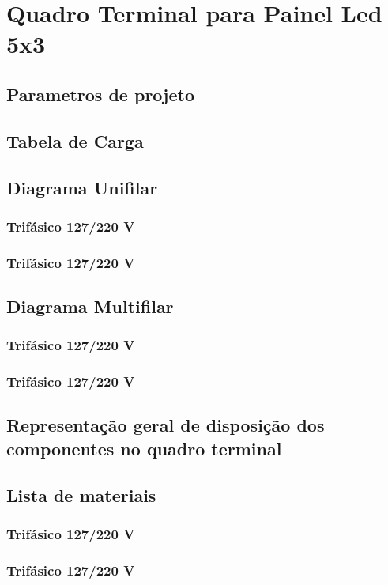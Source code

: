 \section{Quadro Terminal para Painel Led 5x3}
\subsection{Parametros de projeto}
\subsection{Tabela de Carga}
\subsection{Diagrama Unifilar}

\subsubsection{Trifásico 127/220 V}

\subsubsection{Trifásico 127/220 V}

\subsection{Diagrama Multifilar}

\subsubsection{Trifásico 127/220 V}

\subsubsection{Trifásico 127/220 V}

\subsection{Representação geral de disposição dos componentes no quadro terminal}

\subsection{Lista de materiais}

\subsubsection{Trifásico 127/220 V}

\subsubsection{Trifásico 127/220 V}